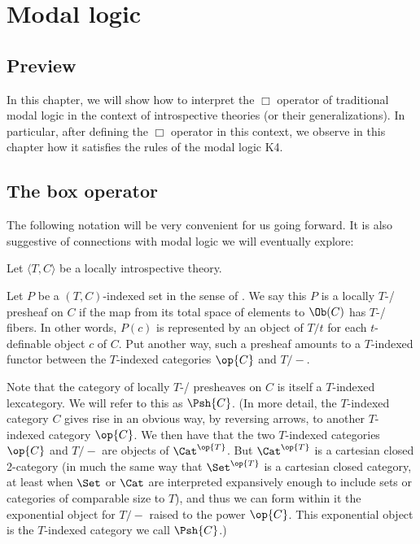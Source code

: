 \filestart

\section{Modal logic}\label{ModalChapter}
\subsection{Preview}
In this chapter, we will show how to interpret the $\Box$ operator of traditional modal logic in the context of introspective theories (or their generalizations). In particular, after defining the $\Box$ operator in this context, we observe in this chapter how it satisfies the rules of the modal logic K4.

\subsection{The box operator}
The following notation will be very convenient for us going forward. It is also suggestive of connections with modal logic we will eventually explore:

Let $\langle T, C \rangle$ be a locally introspective theory.

Let $P$ be a $(T, C)$-indexed set in the sense of . We say this $P$ is a locally $T$-\repsmall/ presheaf on $C$ if the map from its total space of elements to $\Ob(C)$ has $T$-\repsmall/ fibers. In other words, $P(c)$ is represented by an object of $T/t$ for each $t$-definable object $c$ of $C$. Put another way, such a presheaf amounts to a $T$-indexed functor between the $T$-indexed categories $\op{C}$ and $T/-$.

Note that the category of locally $T$-\repsmall/ presheaves on $C$ is itself a $T$-indexed lexcategory. We will refer to this as $\Psh{C}$. (In more detail, the $T$-indexed category $C$ gives rise in an obvious way, by reversing arrows, to another $T$-indexed category $\op{C}$. We then have that the two $T$-indexed categories $\op{C}$ and $T/-$ are objects of $\Cat^{\op{T}}$. But $\Cat^{\op{T}}$ is a cartesian closed 2-category (in much the same way that $\Set^{\op{T}}$ is a cartesian closed category, at least when $\Set$ or $\Cat$ are interpreted expansively enough to include sets or categories of comparable size to $T$), and thus we can form within it the exponential object for $T/-$ raised to the power $\op{C}$. This exponential object is the $T$-indexed category we call $\Psh{C}$.)


